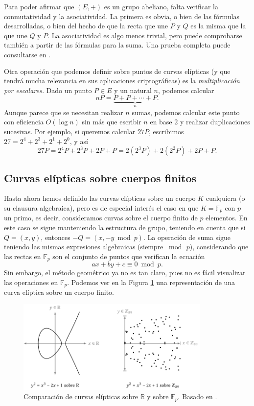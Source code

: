 \documentclass[
  a4paper,
  12pt,
  spanish,
]{scrartcl}
\begin{document}
    Para poder afirmar que $(E, +)$ es un grupo abeliano, falta verificar la conmutatividad y la asociatividad. La primera es obvia, o bien de las fórmulas desarrolladas, o bien del hecho de que la recta que une $P$ y $Q$ es la misma que la que une $Q$ y $P$. La asociatividad es algo menos trivial, pero puede comprobarse también a partir de las fórmulas para la suma. Una prueba completa puede consultarse en \parencite[sección 2.4]{elliptic_washington_2008}.
    
    Otra operación que podemos definir sobre puntos de curvas elípticas (y que tendrá mucha relevancia en sus aplicaciones criptográficas) es la \textit{multiplicación por escalares.} Dado un punto $P\in E$ y un natural $n$, podemos calcular \[ nP = \underbrace{P + P + \cdots + P}_{n}.\] Aunque parece que se necesitan realizar $n$ sumas, podemos calcular este punto con eficiencia $O(\log n)$ sin más que escribir $n$ en base 2 y realizar duplicaciones sucesivas. Por ejemplo, si queremos calcular $27P$, escribimos $27 = 2^4 + 2^3 + 2^1 + 2^0$, y así \[ 27P = 2^4P + 2^3P + 2P + P = 2(2^3P) + 2(2^2P) + 2P + P.\]
    
\subsection{Curvas elípticas sobre cuerpos finitos}

Hasta ahora hemos definido las curvas elípticas sobre un cuerpo $K$ cualquiera (o su clausura algebraica), pero es de especial interés el caso en que $K=\mathbb{F}_p$ con $p$ un primo, es decir, consideramos curvas sobre el cuerpo finito de $p$ elementos. En este caso se sigue manteniendo la estructura de grupo, teniendo en cuenta que si $Q = (x,y)$, entonces $-Q = (x, -y \bmod p)$. La operación de suma sigue teniendo las mismas expresiones algebraicas (siempre $\bmod\, p$), considerando que las rectas en $\mathbb{F}_p$ son el conjunto de puntos que verifican la ecuación \[ ax + by + c \equiv 0 \bmod p. \] Sin embargo, el método geométrico ya no es tan claro, pues no es fácil visualizar las operaciones en $\mathbb{F}_p$. Podemos ver en la Figura \ref{fig:cuerpos-curvas} una representación de una curva elíptica sobre un cuerpo finito.

\begin{figure}[h]
  \centering
  \includegraphics[width=0.85\textwidth]{img/cuerpos-curvas}
  \caption{Comparación de curvas elípticas sobre $\mathbb{R}$ y sobre $\mathbb{F}_p$. Basado en \parencite{eichlseder_elliptic_2016}.}
  \label{fig:cuerpos-curvas}
\end{figure}
\end{document}
